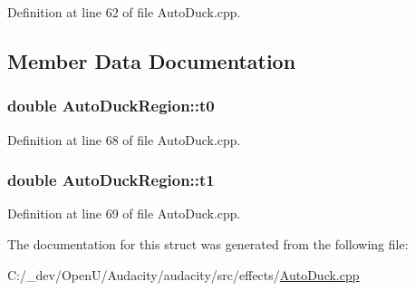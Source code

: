 Definition at line 62 of file Auto\+Duck.\+cpp.



\subsection{Member Data Documentation}
\subsubsection[{\texorpdfstring{t0}{t0}}]{\setlength{\rightskip}{0pt plus 5cm}double Auto\+Duck\+Region\+::t0}\hypertarget{struct_auto_duck_region_a979129b9eea0a53c80956edb805079ae}{}\label{struct_auto_duck_region_a979129b9eea0a53c80956edb805079ae}


Definition at line 68 of file Auto\+Duck.\+cpp.

\subsubsection[{\texorpdfstring{t1}{t1}}]{\setlength{\rightskip}{0pt plus 5cm}double Auto\+Duck\+Region\+::t1}\hypertarget{struct_auto_duck_region_ab36d9a31ca0d4cb1dd673dd7fc5e9f01}{}\label{struct_auto_duck_region_ab36d9a31ca0d4cb1dd673dd7fc5e9f01}


Definition at line 69 of file Auto\+Duck.\+cpp.



The documentation for this struct was generated from the following file\+:\begin{DoxyCompactItemize}
\item 
C\+:/\+\_\+dev/\+Open\+U/\+Audacity/audacity/src/effects/\hyperlink{_auto_duck_8cpp}{Auto\+Duck.\+cpp}\end{DoxyCompactItemize}
